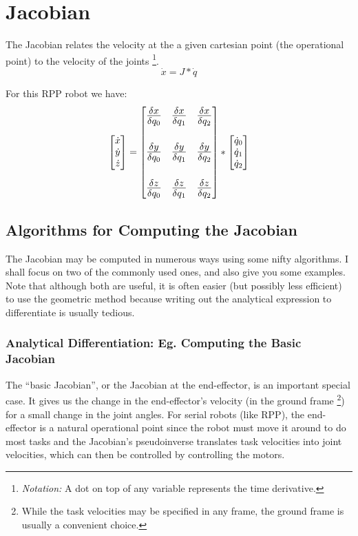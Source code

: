 \documentclass[12pt]{article}
\begin{document}
\section{Jacobian}
The Jacobian relates the velocity at the a given cartesian point (the operational point)
 to the velocity of the joints
\footnote{{\em Notation:} A dot on top of any variable represents the time derivative.}.
\begin{equation}
  \dot x = J * \dot q
\end{equation}

For this RPP robot we have:
\begin{equation}
  \begin{bmatrix} 
  \dot x \\
  \dot y \\
  \dot z \\
  \end{bmatrix} 
  = 
  {\Large
  \begin{bmatrix} 
    \frac{\delta x}{\delta q_0} & \frac{\delta x}{\delta q_1} & \frac{\delta x}{\delta q_2} \\
    \\
    \frac{\delta y}{\delta q_0} & \frac{\delta y}{\delta q_1} & \frac{\delta y}{\delta q_2} \\ 
    \\
    \frac{\delta z}{\delta q_0} & \frac{\delta z}{\delta q_1} & \frac{\delta z}{\delta q_2}
  \end{bmatrix} 
  }* 
  \begin{bmatrix}
  \dot q_0 \\
  \dot q_1 \\
  \dot q_2 
  \end{bmatrix} 
\end{equation}

\subsection{Algorithms for Computing the Jacobian}
The Jacobian may be computed in numerous ways using some nifty algorithms. I shall focus
on two of the commonly used ones, and also give you some examples. Note that although both
are useful, it is often easier (but possibly less efficient) to use the geometric method 
because writing out the analytical expression to differentiate is usually tedious.

\subsubsection{Analytical Differentiation: Eg. Computing the Basic Jacobian}
The ``basic Jacobian'', or the Jacobian at the end-effector, is an important special case.
It gives us the change in the end-effector's velocity (in the ground frame 
\footnote{While the task velocities may be specified in any frame, the ground frame is usually
a convenient choice.}) 
for a small change in the joint angles.
For serial robots (like RPP), the end-effector is a natural operational point since 
the robot must move it around to do most tasks and the Jacobian's pseudoinverse translates
task velocities into joint velocities, which can then be controlled by controlling the motors.
\end{document}
